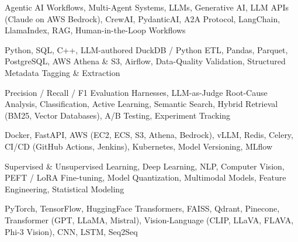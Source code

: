\documentclass[letter,10pt]{article}
\begin{document}
 Agentic AI Workflows, Multi-Agent Systems, LLMs, Generative AI, LLM APIs (Claude on AWS Bedrock), CrewAI, PydanticAI, A2A Protocol, LangChain, LlamaIndex, RAG, Human-in-the-Loop Workflows\par\vspace{2pt}

 Python, SQL, C++, LLM-authored DuckDB / Python ETL, Pandas, Parquet, PostgreSQL, AWS Athena \& S3, Airflow, Data-Quality Validation, Structured Metadata Tagging \& Extraction\par\vspace{2pt}

 Precision / Recall / F1 Evaluation Harnesses, LLM-as-Judge Root-Cause Analysis, Classification, Active Learning, Semantic Search, Hybrid Retrieval (BM25, Vector Databases), A/B Testing, Experiment Tracking\par\vspace{2pt}

 Docker, FastAPI, AWS (EC2, ECS, S3, Athena, Bedrock), vLLM, Redis, Celery, CI/CD (GitHub Actions, Jenkins), Kubernetes, Model Versioning, MLflow\par\vspace{2pt}

 Supervised \& Unsupervised Learning, Deep Learning, NLP, Computer Vision, PEFT / LoRA Fine-tuning, Model Quantization, Multimodal Models, Feature Engineering, Statistical Modeling\par\vspace{2pt}

 PyTorch, TensorFlow, HuggingFace Transformers, FAISS, Qdrant, Pinecone, Transformer (GPT, LLaMA, Mistral), Vision-Language (CLIP, LLaVA, FLAVA, Phi-3 Vision), CNN, LSTM, Seq2Seq
\end{document}

